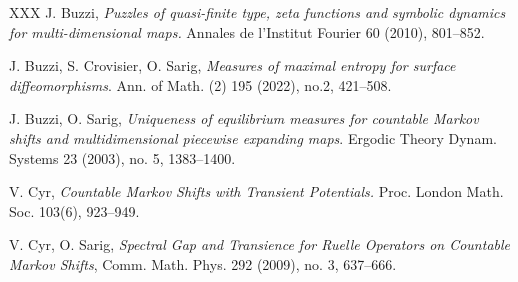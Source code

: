 \documentclass[letterpaper,11pt]{amsart}
\theoremstyle{plain}
\theoremstyle{plain}
\theoremstyle{definition}
\theoremstyle{remark}
\begin{document}
\begin{thebibliography}{XXX}
 J. Buzzi, \emph{Puzzles of quasi-finite type, zeta functions and symbolic dynamics for multi-dimensional maps.}  Annales de l'Institut Fourier 60 (2010), 801--852.

  J. Buzzi, S. Crovisier, O. Sarig, \emph{Measures of maximal entropy for surface diffeomorphisms}. Ann. of Math. (2) 195 (2022), no.2, 421--508.


 J. Buzzi, O. Sarig, \emph{Uniqueness of equilibrium measures for countable Markov shifts and multidimensional piecewise expanding maps}. Ergodic Theory Dynam. Systems 23 (2003), no. 5, 1383--1400. 














 V. Cyr, \emph{Countable Markov Shifts with Transient Potentials.} Proc. London Math. Soc. 103(6), 923--949.

 V. Cyr, O. Sarig, \emph{Spectral Gap and Transience for Ruelle Operators on Countable Markov Shifts}, Comm. Math. Phys. 292 (2009), no. 3, 637--666.






\end{thebibliography}
\end{document}
